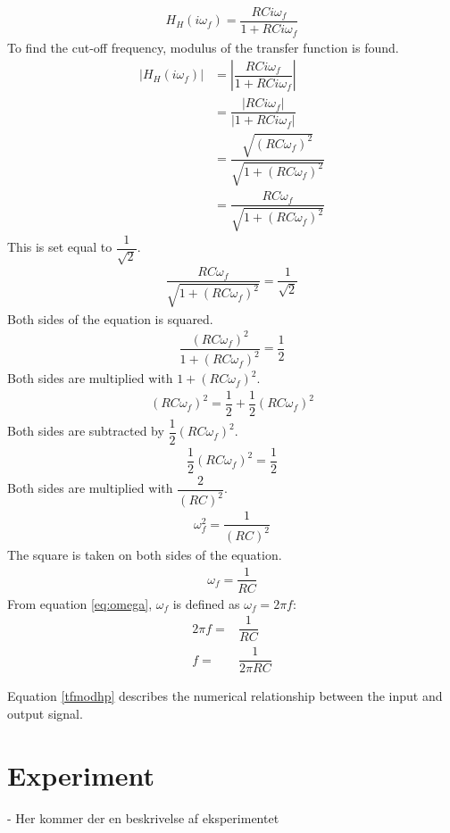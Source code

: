 \begin{align*}
H_{H}(i \omega_f) = \dfrac{RCi \omega_f}{1 + RCi \omega_f}
\end{align*}
To find the cut-off frequency, modulus of the transfer function is found.
\begin{align}
\left|H_{H}(i \omega_f)\right| &= \left|\dfrac{RCi \omega_f}{1 + RCi \omega_f} \right| \\
 &= \dfrac{|RCi \omega_f|}{|1 + RCi \omega_f |} \\
 &= \dfrac{\sqrt{(RC \omega_f)^2}}{\sqrt{1 + (RC \omega_f)^2 }} \\
 &= \dfrac{RC \omega_f}{\sqrt{1 + (RC \omega_f)^2 }} \label{tfmodhp}
\end{align} 
This is set equal to $\dfrac{1}{\sqrt{2}}$.
\begin{align}
\dfrac{RC \omega_f}{\sqrt{1 + (RC \omega_f)^2 }}=\dfrac{1}{\sqrt{2}}
\end{align}
Both sides of the equation is squared.
\begin{align}
\dfrac{(RC \omega_f)^2}{1 + (RC \omega_f)^2 }=\dfrac{1}{2}
\end{align}
Both sides are multiplied with $1+(RC\omega_f)^2$.
\begin{align}
(RC \omega_f)^2 =\dfrac{1}{2}+\dfrac{1}{2}(RC\omega_f)^2
\end{align}
Both sides are subtracted  by $\dfrac{1}{2}(RC\omega_f)^2$.
\begin{align}
\dfrac{1}{2}(RC \omega_f)^2 =\dfrac{1}{2}
\end{align}
Both sides are multiplied with $\dfrac{2}{(RC)^2}$.
\begin{align}
\omega_f^2 =\dfrac{1}{(RC)^2}
\end{align}
The square is taken on both sides of the equation.
\begin{align}
\omega_f =\dfrac{1}{RC}
\end{align}
From equation \eqref{eq:omega}, $\omega_f$ is defined as $\omega_f=2 \pi f$:
\begin{align}
2\pi f=&\dfrac{1}{RC}
\\
f=&\dfrac{1}{2\pi RC}
\end{align}

Equation \eqref{tfmodhp} describes the numerical relationship between the input and output signal.


\section{Experiment} \label{experiment}
- Her kommer der en beskrivelse af eksperimentet

